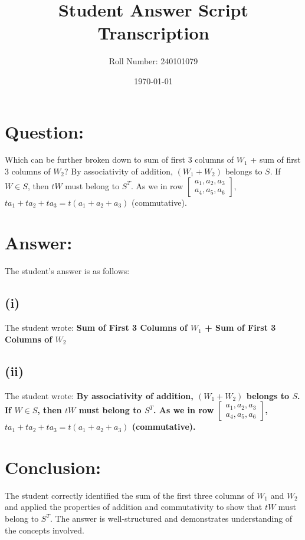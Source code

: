 \documentclass[12pt]{article}
\title{Student Answer Script Transcription}
\author{Roll Number: 240101079}
\date{\today}
\begin{document}
\maketitle

\section*{Question:}
Which can be further broken down to sum of first 3 columns of $W_{1}$ + sum of first 3 columns of $W_{2}$? By associativity of addition, $(W_{1}+W_{2})$ belongs to $S$. If $W \in S$, then $tW$ must belong to $S^{T}$. As we in row $\left[\begin{array}{ccc}a_{1}, a_{2}, a_{3}\\a_{4}, a_{5}, a_{6}\end{array}\right]$, $ta_{1}+ta_{2}+ta_{3}=t(a_{1}+a_{2}+a_{3})$ (commutative).

\section*{Answer:}
The student's answer is as follows:

\subsection*{(i)}
The student wrote:
\textbf{Sum of First 3 Columns of $W_{1}$ + Sum of First 3 Columns of $W_{2}$}

\subsection*{(ii)}
The student wrote:
\textbf{By associativity of addition, $(W_{1}+W_{2})$ belongs to $S$. If $W \in S$, then $tW$ must belong to $S^{T}$. As we in row $\left[\begin{array}{ccc}a_{1}, a_{2}, a_{3}\\a_{4}, a_{5}, a_{6}\end{array}\right]$, $ta_{1}+ta_{2}+ta_{3}=t(a_{1}+a_{2}+a_{3})$ (commutative).}

\section*{Conclusion:}
The student correctly identified the sum of the first three columns of $W_{1}$ and $W_{2}$ and applied the properties of addition and commutativity to show that $tW$ must belong to $S^{T}$. The answer is well-structured and demonstrates understanding of the concepts involved.
\end{document}
